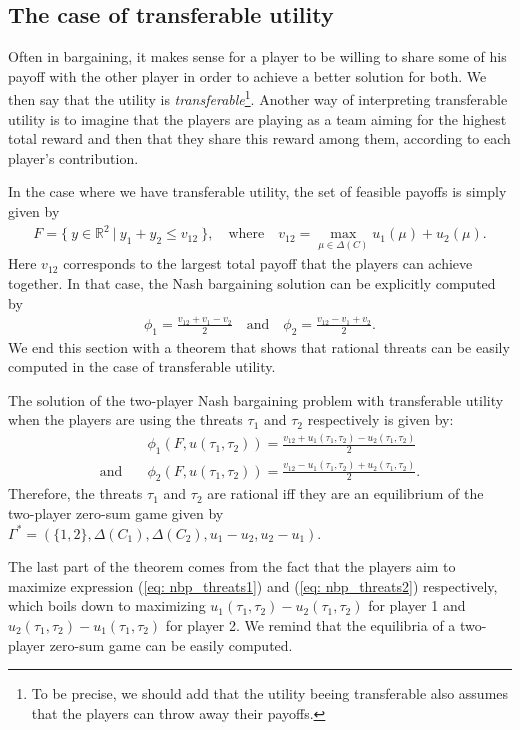 \subsection{The case of transferable utility}



Often in bargaining, it makes sense for a player to be willing to share some of his payoff with the other player in order to achieve a better solution for both. We then say that the utility is \emph{transferable}\footnote{\footnotesize To be precise, we should add that the utility beeing transferable also assumes that the players can throw away their payoffs.}. Another way of interpreting transferable utility is to imagine that the players are playing as a team aiming for the highest total reward and then that they share this reward among them, according to each player's contribution.

In the case where we have transferable utility, the set of feasible payoffs is simply given by
\begin{align*}
	F = \{ \ y \in \mathbb{R}^2 \ | \ y_1 + y_2 \leq v_{12} \ \}, \quad \text{where} \quad v_{12} = \max_{\mu \in \Delta(C)} u_1(\mu) + u_2(\mu).
\end{align*}
Here $v_{12}$ corresponds to the largest total payoff that the players can achieve together. In that case, the Nash bargaining solution can be explicitly computed by
\begin{align*}
	\phi_1 = \frac{v_{12} + v_1 - v_2}{2} \quad \text{and} \quad \phi_2 = \frac{v_{12} - v_1 + v_2}{2}.
\end{align*}
We end this section with a theorem that shows that rational threats can be easily computed in the case of transferable utility.
\begin{theorem}
The solution of the two-player Nash bargaining problem with transferable utility when the players are using the threats $\tau_1$ and $\tau_2$ respectively is given by:
\begin{align}
	&\phi_1(F, u(\tau_1, \tau_2)) = \frac{v_{12} + u_1(\tau_1, \tau_2) - u_2(\tau_1, \tau_2)}{2}\label{eq: nbp_threats1}\\
	\text{and} \quad &\phi_2(F, u(\tau_1, \tau_2)) = \frac{v_{12} - u_1(\tau_1, \tau_2) + u_2(\tau_1, \tau_2)}{2}. \label{eq: nbp_threats2}
\end{align}
Therefore, the threats $\tau_1$ and $\tau_2$ are rational iff they are an equilibrium of the two-player zero-sum game given by $\Gamma^*=(\{1,2\}, \Delta(C_1), \Delta(C_2), u_1-u_2, u_2-u_1)$.
\end{theorem}
The last part of the theorem comes from the fact that the
players aim to maximize expression (\ref{eq: nbp_threats1}) and (\ref{eq: nbp_threats2}) respectively, which boils down to maximizing $u_1(\tau_1, \tau_2) - u_2(\tau_1, \tau_2)$ for player 1 and $u_2(\tau_1, \tau_2) - u_1(\tau_1, \tau_2)$ for player 2. We remind that the equilibria of a two-player zero-sum game can be easily computed.


